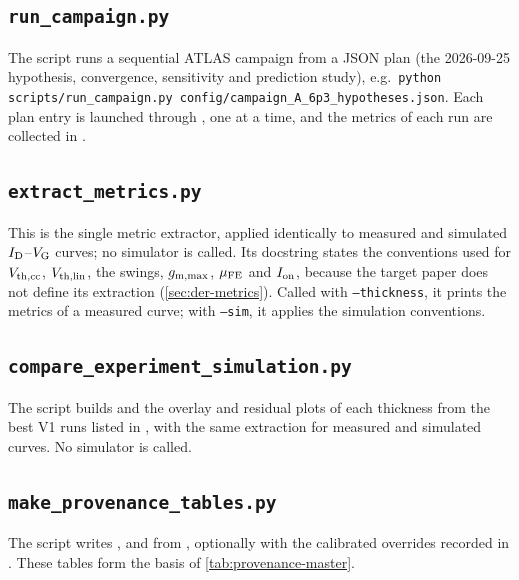 \subsection{\texttt{run\_campaign.py}}
The script runs a sequential ATLAS campaign from a JSON plan (the 2026-09-25 hypothesis, convergence, sensitivity and
prediction study), e.g.\ \texttt{python scripts/run\_campaign.py config/campaign\_A\_6p3\_hypotheses.json}. Each plan
entry is launched through , one at a time, and the metrics of each run are collected in
.


\subsection{\texttt{extract\_metrics.py}}
This is the single metric extractor, applied identically to measured and simulated $I_{\mathrm{D}}$--$V_{\mathrm{G}}$ curves; no simulator is
called. Its docstring states the conventions used for $V_{\mathrm{th,cc}}$, $V_{\mathrm{th,lin}}$, the swings, $g_{\mathrm{m,max}}$, $\mu_{\mathrm{FE}}$ and $I_{\mathrm{on}}$,
because the target paper does not define its extraction (\cref{sec:der-metrics}). Called with \texttt{--thickness}, it
prints the metrics of a measured curve; with \texttt{--sim}, it applies the simulation conventions.


\subsection{\texttt{compare\_experiment\_simulation.py}}
The script builds  and the overlay and residual plots of each thickness
from the best V1 runs listed in , with the same extraction for measured and simulated
curves. No simulator is called.


\subsection{\texttt{make\_provenance\_tables.py}}
The script writes ,  and
 from , optionally with the calibrated overrides
recorded in . These tables form the basis of \cref{tab:provenance-master}.


